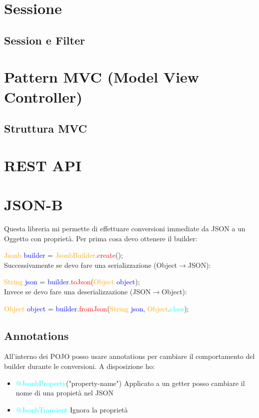 \documentclass[11pt, letterpaper, titlepage]{article}
\newcommand{\class}[1]{\textcolor{orange}{#1}}
\newcommand{\object}[1]{\textcolor{blue}{#1}}
\newcommand{\method}[1]{\textcolor{red}{#1}}
\newcommand{\propery}[1]{\textcolor{cyan}{#1}}
\newcommand{\annotation}[1]{\textcolor{cyan}{#1}}
\begin{document}
\section{Sessione}

\subsection{Session e Filter}

\section{Pattern MVC (Model View Controller)}

\newpage
\subsection{Struttura MVC}

\newpage

\section{REST API}

\section{JSON-B}
Questa libreria mi permette di effettuare conversioni immediate da JSON a un Oggetto con
propriet\`a. Per prima cosa devo ottenere il builder:\par
\class{Jsonb} \object{builder} = \class{JsonbBuilder}.\method{create}();\\
Successivamente se devo fare una serializzazione (Object$\rightarrow$JSON):\par
\class{String} \object{json} = \object{builder}.\method{toJson}(\class{Object} \object{object});\\
Invece se devo fare una deserializzazione (JSON$\rightarrow$Object):\par
\class{Object} \object{object} = \object{builder}.\method{fromJson}(\class{String} \object{json}, \class{Object}.\propery{class});

\subsection{Annotations}
All'interno dei POJO posso usare annotations per cambiare il comportamento del builder durante
le conversioni. A disposizione ho:
\begin{itemize}
    \item \annotation{@JsonbProperty}("property-name") Applicato a un getter posso cambiare il nome di una propiet\`a nel JSON
    \item \annotation{@JsonbTransient} Ignora la propriet\`a
\end{itemize}
\end{document}
